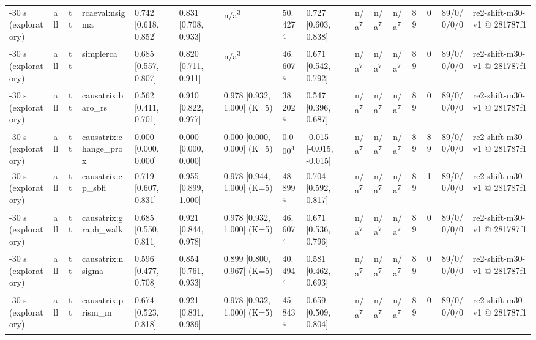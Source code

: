 \begin{table}[t]
\begin{tabular}{llllllllllllllll}
-30 s (exploratory) & all & tt & rcaeval:nsigma & 0.742 [0.618, 0.852] & 0.831 [0.708, 0.933] & n/a\textsuperscript{3} & 50.427\textsuperscript{4} & 0.727 [0.603, 0.838] & n/a\textsuperscript{7} & n/a\textsuperscript{7} & n/a\textsuperscript{7} & 89 & 0 & 89/0/0/0/0 & re2-shift-m30-v1 @ 281787f1 \\
-30 s (exploratory) & all & tt & simplerca & 0.685 [0.557, 0.807] & 0.820 [0.711, 0.911] & n/a\textsuperscript{3} & 46.607\textsuperscript{4} & 0.671 [0.542, 0.792] & n/a\textsuperscript{7} & n/a\textsuperscript{7} & n/a\textsuperscript{7} & 89 & 0 & 89/0/0/0/0 & re2-shift-m30-v1 @ 281787f1 \\
-30 s (exploratory) & all & tt & causatrix:baro\_rs & 0.562 [0.411, 0.701] & 0.910 [0.822, 0.977] & 0.978 [0.932, 1.000] (K=5) & 38.202\textsuperscript{4} & 0.547 [0.396, 0.687] & n/a\textsuperscript{7} & n/a\textsuperscript{7} & n/a\textsuperscript{7} & 89 & 0 & 89/0/0/0/0 & re2-shift-m30-v1 @ 281787f1 \\
-30 s (exploratory) & all & tt & causatrix:change\_prox & 0.000 [0.000, 0.000] & 0.000 [0.000, 0.000] & 0.000 [0.000, 0.000] (K=5) & 0.000\textsuperscript{4} & -0.015 [-0.015, -0.015] & n/a\textsuperscript{7} & n/a\textsuperscript{7} & n/a\textsuperscript{7} & 89 & 89 & 89/0/0/0/0 & re2-shift-m30-v1 @ 281787f1 \\
-30 s (exploratory) & all & tt & causatrix:cp\_sbfl & 0.719 [0.607, 0.831] & 0.955 [0.899, 1.000] & 0.978 [0.944, 1.000] (K=5) & 48.899\textsuperscript{4} & 0.704 [0.592, 0.817] & n/a\textsuperscript{7} & n/a\textsuperscript{7} & n/a\textsuperscript{7} & 89 & 1 & 89/0/0/0/0 & re2-shift-m30-v1 @ 281787f1 \\
-30 s (exploratory) & all & tt & causatrix:graph\_walk & 0.685 [0.550, 0.811] & 0.921 [0.844, 0.978] & 0.978 [0.932, 1.000] (K=5) & 46.607\textsuperscript{4} & 0.671 [0.536, 0.796] & n/a\textsuperscript{7} & n/a\textsuperscript{7} & n/a\textsuperscript{7} & 89 & 0 & 89/0/0/0/0 & re2-shift-m30-v1 @ 281787f1 \\
-30 s (exploratory) & all & tt & causatrix:nsigma & 0.596 [0.477, 0.708] & 0.854 [0.761, 0.933] & 0.899 [0.800, 0.967] (K=5) & 40.494\textsuperscript{4} & 0.581 [0.462, 0.693] & n/a\textsuperscript{7} & n/a\textsuperscript{7} & n/a\textsuperscript{7} & 89 & 0 & 89/0/0/0/0 & re2-shift-m30-v1 @ 281787f1 \\
-30 s (exploratory) & all & tt & causatrix:prism\_m & 0.674 [0.523, 0.818] & 0.921 [0.831, 0.989] & 0.978 [0.932, 1.000] (K=5) & 45.843\textsuperscript{4} & 0.659 [0.509, 0.804] & n/a\textsuperscript{7} & n/a\textsuperscript{7} & n/a\textsuperscript{7} & 89 & 0 & 89/0/0/0/0 & re2-shift-m30-v1 @ 281787f1 \\

\end{tabular}
\end{table}
